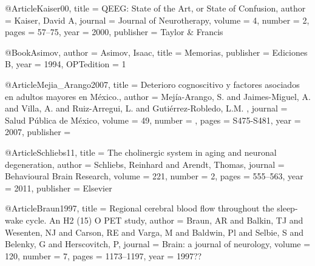 @Article{Kaiser00,
    title     = {{QEEG}: {S}tate of the {A}rt, or {S}tate of {C}onfusion},
    author    = {Kaiser, David A},
    journal   = {Journal of {N}eurotherapy},
    volume    = {4},
    number    = {2},
    pages     = {57--75},
    year      = {2000},
    publisher = {Taylor \& Francis}
}

%

@Book{Asimov,
author = {Asimov, Isaac},
title = {Memorias},
publisher = {Ediciones B},
year = {1994},
OPTedition = {1}
}


@Article{Mejia_Arango2007,
  title   = {Deterioro cognoscitivo y factores asociados en adultos mayores en M\'exico.},
  author  = {Mej\'ia-Arango, S. 
  			 and  Jaimes-Miguel, A. 
  			 and Villa, A.  
  			 and Ruiz-Arregui, L. 
  			 and Guti\'errez-Robledo, L.M. },
  journal = {Salud Pública de México},
  volume  = {49},
  number  = {},
  pages   = {S475-S481},
  year    = {2007},
  publisher = {}
}

@Article{Schliebs11,
  title   = {The cholinergic system in aging and neuronal degeneration},
  author  = {Schliebs, Reinhard 
             and Arendt, Thomas},
  journal = {{Behavioural Brain Research}},
  volume  = {221},
  number  = {2},
  pages   = {555--563},
  year    = {2011},
  publisher = {Elsevier}
}


@Article{Braun1997,
  title   = {{Regional cerebral blood flow throughout the sleep-wake cycle. An H2 (15) O PET 
              study}},
  author  = {Braun, AR 
             and Balkin, TJ 
             and Wesenten, NJ 
             and Carson, RE 
             and Varga, M 
             and Baldwin, Pl 
             and Selbie, S 
             and Belenky, G 
             and Herscovitch, P},
  journal = {Brain: a journal of neurology},
  volume  = {120},
  number  = {7},
  pages   = {1173--1197},
  year    = {1997??}
}

